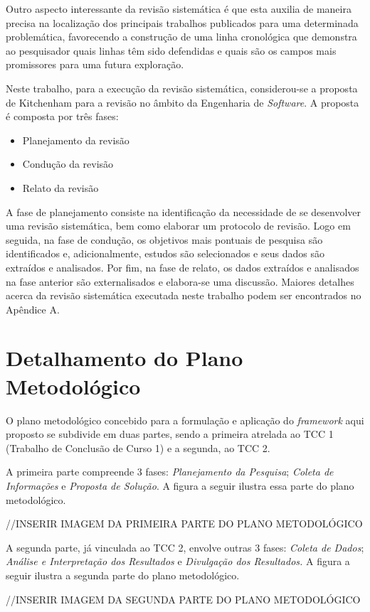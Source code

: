 Outro aspecto interessante da revisão sistemática é que esta auxilia de maneira precisa na localização dos principais trabalhos publicados para uma determinada problemática, favorecendo a construção de uma linha cronológica que demonstra ao pesquisador quais linhas têm sido defendidas e quais são os campos mais promissores para uma futura exploração.

Neste trabalho, para a execução da revisão sistemática, considerou-se a proposta de Kitchenham para a revisão no âmbito da Engenharia de \textit{Software}. A proposta é composta por três fases:

\begin{itemize}
	\item Planejamento da revisão
	\item Condução da revisão
	\item Relato da revisão
\end{itemize}

A fase de planejamento consiste na identificação da necessidade de se desenvolver uma revisão sistemática, bem como elaborar um protocolo de revisão. Logo em seguida, na fase de condução, os objetivos mais pontuais de pesquisa são identificados e, adicionalmente, estudos são selecionados e seus dados são extraídos e analisados. Por fim, na fase de relato, os dados extraídos e analisados na fase anterior são externalisados e elabora-se uma discussão. Maiores detalhes acerca da revisão sistemática executada neste trabalho podem ser encontrados no Apêndice A.

\section{Detalhamento do Plano Metodológico}

O plano metodológico concebido para a formulação e aplicação do \textit{framework} aqui proposto se subdivide em duas partes, sendo a primeira atrelada ao TCC 1 (Trabalho de Conclusão de Curso 1) e a segunda, ao TCC 2.

A primeira parte compreende 3 fases: \textit{Planejamento da Pesquisa}; \textit{Coleta de Informações} e \textit{Proposta de Solução}. A figura a seguir ilustra essa parte do plano metodológico.

//INSERIR IMAGEM DA PRIMEIRA PARTE DO PLANO METODOLÓGICO

A segunda parte, já vinculada ao TCC 2, envolve outras 3 fases: \textit{Coleta de Dados}; \textit{Análise e Interpretação dos Resultados} e \textit{Divulgação dos Resultados.} A figura a seguir ilustra a segunda parte do plano metodológico.

//INSERIR IMAGEM DA SEGUNDA PARTE DO PLANO METODOLÓGICO